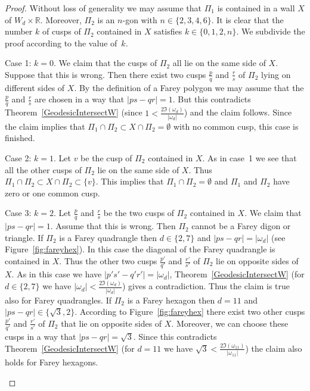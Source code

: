 \documentclass[graybox]{svmult}
\begin{document}
\begin{proof}
Without loss of generality we may assume that $\Pi_1$ is contained in a wall $X$ of $W_d\times\mathbb{R}$. Moreover, $\Pi_2$ is an $n$-gon with $n\in\{2,3,4,6\}$. It is clear that the number $k$ of cusps of $\Pi_2$  contained in $X$ satisfies $k\in\{0,1,2,n\}$. We subdivide the proof according to the value of~$k$.

Case 1: $k=0$. We claim that the cusps of $\Pi_2$ all lie on the same side of $X$. Suppose that this is wrong. Then there exist two cusps $\frac pq$ and $\frac rs$ of $\Pi_2$ lying on different sides of $X$. By the definition of a Farey polygon we may assume that the $\frac pq$ and $\frac rs$ are chosen in a way that $|ps - qr|=1$. But this contradicts Theorem~\ref{GeodesicIntersectW} (since $1<\frac{2\Im(\omega_d)}{|\omega_d|}$) and the claim follows. Since the claim implies that $\Pi_1 \cap \Pi_2 \subset X \cap \Pi_2  = \emptyset$ with no common cusp, this case is finished.

Case 2: $k=1$. Let $v$ be the cusp of $\Pi_2$ contained in $X$. As in case~1 we see that all the other cusps of $\Pi_2$ lie on the same side of $X$. Thus $\Pi_1 \cap \Pi_2 \subset X \cap \Pi_2  \subset \{v\}$. This implies that $\Pi_1 \cap \Pi_2=\emptyset$ and $\Pi_1$ and $\Pi_2$ have zero or one common cusp.

Case 3: $k=2$. Let $\frac pq$ and $\frac rs$ be the two cusps of $\Pi_2$ contained in $X$. We claim that $|ps-qr|=1$. Assume that this is wrong. Then $\Pi_2$ cannot be a Farey digon or triangle. If $\Pi_2$ is a Farey quadrangle then $d\in\{2,7\}$ and $|ps-qr|=|\omega_{d}|$ (see Figure~\ref{fig:fareyhex}). In this case the diagonal of the Farey quadrangle is contained in $X$. Thus the other two cusps $\frac{p'}{q'}$ and $\frac{r'}{s'}$ of $\Pi_2$ lie on opposite sides of $X$. As in this case we have $|p's'-q'r'|=|\omega_{d}|$, Theorem~\ref{GeodesicIntersectW} (for $d\in\{2,7\}$ we have $|\omega_{d}|<\frac{2\Im(\omega_{d})}{|\omega_{d}|}$) gives a contradiction. Thus the claim is true also for Farey quadrangles. If $\Pi_2$ is a Farey hexagon then $d=11$ and $|ps-qr|\in \{\sqrt{3},2\}$. According to Figure~\ref{fig:fareyhex} there exist two other cusps $\frac{p'}{q'}$ and $\frac{r'}{s'}$ of $\Pi_2$ that lie on opposite sides of $X$. Moreover, we can choose these cusps in a way that $|ps-qr|=\sqrt{3}$. Since this contradicts Theorem~\ref{GeodesicIntersectW} (for $d=11$ we have $\sqrt{3}<\frac{2\Im(\omega_{11})}{|\omega_{11}|}$) the claim also holds for Farey hexagons.
\begin{figure}
\begin{tikzpicture}[scale=0.3]


\end{tikzpicture}
\end{figure}
\end{proof}
\end{document}
